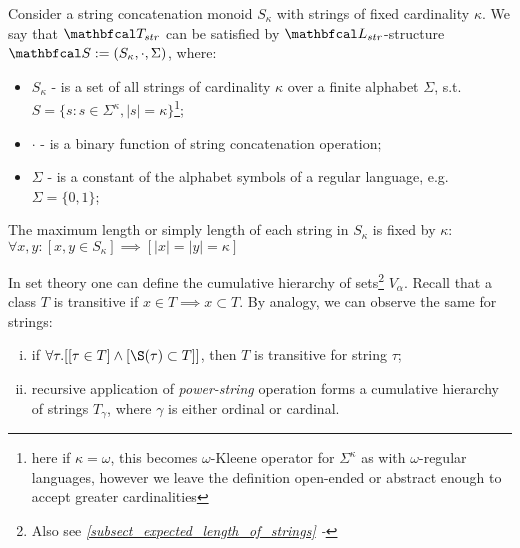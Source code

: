 \begin{theorem}\label{theorem_kStrModel}
  Consider a string concatenation monoid $S_{\kappa}$ with strings of fixed cardinality $\kappa$. We say that $\LsT_{str}$ can be satisfied by $\lsign_{str}$-structure $\LsS := (S_{\kappa},\cdot,\Sigma)$, where:
  \begin{itemize}
    \item $S_{\kappa}$ - is a set of all strings of cardinality $\kappa$ over a finite alphabet $\Sigma$, s.t. $S = \{ s : s \in \Sigma^\kappa, |s| = \kappa\}$\footnote{here if $\kappa = \omega$, this becomes $\omega$-Kleene operator for $\Sigma^\kappa$ as with $\omega$-regular languages, however we leave the definition open-ended or abstract enough to accept greater cardinalities};

    \item $\cdot$ - is a binary function of string concatenation operation;

    \item $\Sigma$ - is a constant of the alphabet symbols of a regular language, e.g. $\Sigma = \{0,1\}$;
  \end{itemize}
\end{theorem}

\begin{lemma}
  The maximum length or simply length of each string in $S_\kappa$ is fixed by $\kappa$: $\forall x,y : [x,y \in S_\kappa] \implies [|x| = |y| = \kappa]$
\end{lemma}










In set theory one can define the cumulative hierarchy of sets\footnote{Also see \textit{\ref{subsect_expected_length_of_strings} - }} $V_\alpha$. Recall that a class $T$ is transitive if $x \in T \implies x \subset T$. By analogy, we can observe the same for strings: 
  \begin{enumerate}[i.)]
    \item if $\forall \tau. [[\tau \in T] \land [\S(\tau) \subset T]]$, then $T$ is transitive for string $\tau$;
    \item recursive application of \textit{power-string} operation forms a cumulative hierarchy of strings $T_\gamma$, where $\gamma$ is either ordinal or cardinal.
  \end{enumerate}

